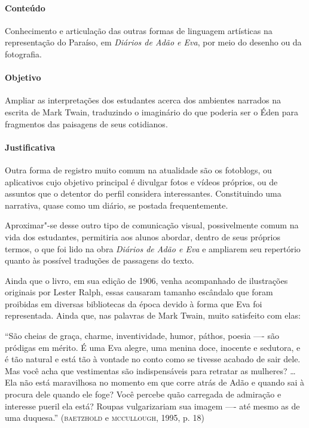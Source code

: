 \documentclass[12pt]{extarticle}
\begin{document}
\paragraph{Conteúdo} Conhecimento e articulação das outras formas de linguagem
artísticas na representação do Paraíso, em \emph{Diários de Adão e Eva}, por meio 
do desenho ou da fotografia.

\paragraph{Objetivo} Ampliar as interpretações dos estudantes acerca dos ambientes narrados na escrita 
de Mark Twain, traduzindo o imaginário do que poderia ser o Éden para fragmentos das paisagens de seus cotidianos. 

\paragraph{Justificativa} Outra forma de registro muito comum na atualidade são os
fotoblogs, ou aplicativos cujo objetivo principal é divulgar fotos e
vídeos próprios, ou de assuntos que o detentor do perfil considera
interessantes. Constituindo uma narrativa, quase como um diário, se postada frequentemente. 

Aproximar"-se desse outro tipo de comunicação visual, possivelmente comum na vida dos estudantes, 
permitiria aos alunos abordar, dentro de seus próprios termos, o que foi lido na obra \emph{Diários de Adão e Eva} 
e ampliarem seu repertório quanto às possível traduções de passagens do texto.

Ainda que o livro, em sua edição de 1906, venha acompanhado de ilustrações originais por Lester Ralph, essas causaram 
tamanho escândalo que foram proibidas em diversas bibliotecas da época devido à forma que Eva foi representada. Ainda que,
nas palavras de Mark Twain, muito satisfeito com elas:

``São cheias de graça, charme, inventividade, humor, páthos, poesia
—- são pródigas em mérito. É uma Eva alegre, uma menina doce,
inocente e sedutora, e é tão natural e está tão à vontade no conto
como se tivesse acabado de sair dele. Mas você acha que vestimentas
são indispensáveis para retratar as mulheres? {}\ldots{} Ela não está
maravilhosa no momento em que corre atrás de Adão e quando
sai à procura dele quando ele foge? Você percebe quão carregada 
de admiração e interesse pueril ela está? Roupas vulgarizariam
sua imagem —- até mesmo as de uma duquesa.'' (\textsc{baetzhold} e \textsc{mccullough},
1995, p. 18)
\end{document}
